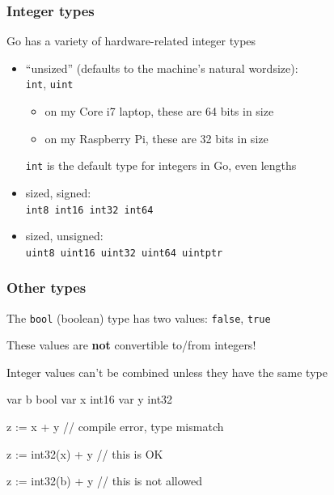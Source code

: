 \documentclass[handout,compress,t,11pt]{beamer}
\begin{document}
\begin{frame}[fragile]
    \frametitle{Integer types}
    Go has a variety of hardware-related integer types
    \begin{itemize}
        \item ``unsized'' (defaults to the machine's natural wordsize): \\
        \verb|int|, \verb|uint| \\
        \vspace{0.5\baselineskip}
        \begin{itemize}
        \item on my Core i7 laptop, these are 64 bits in size
        \item on my Raspberry Pi, these are 32 bits in size
        \end{itemize}
        \vspace{0.5\baselineskip}
        \verb|int| is the default type for integers in Go, even lengths
        \vspace{\baselineskip}
        \item sized, signed: \\
        \verb|int8 int16 int32 int64|
        \vspace{\baselineskip}
        \item sized, unsigned: \\
        \verb|uint8 uint16 uint32 uint64 uintptr|
    \end{itemize}
\end{frame}

\begin{frame}[fragile]
    \frametitle{Other types}
    The \verb|bool| (boolean) type has two values: \verb|false|, \verb|true| \par
        \vspace{0.5\baselineskip}
    These values are {\bf not} convertible to/from integers! \par
        \vspace{2\baselineskip}
    Integer values can't be combined unless they have the same type \par
\begin{golang}
var b bool
var x int16
var y int32

z := x + y           // compile error, type mismatch

z := int32(x) + y    // this is OK

z := int32(b) + y    // this is not allowed
\end{golang}
\end{frame}
\end{document}
